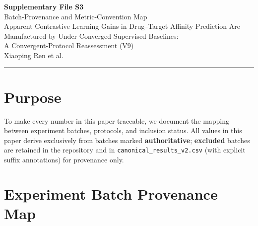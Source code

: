 \documentclass[10pt,a4paper]{article}
\begin{document}
\begin{center}
{\Large\bfseries Supplementary File S3}\\[0.5em]
{\large Batch-Provenance and Metric-Convention Map}\\[1em]
Apparent Contrastive Learning Gains in Drug--Target Affinity Prediction Are Manufactured by Under-Converged Supervised Baselines:\\A Convergent-Protocol Reassessment (V9)\\[0.5em]
Xiaoping Ren et al.
\end{center}

\noindent\rule{\linewidth}{1pt}
\vspace{1em}

\section{Purpose}

To make every number in this paper traceable, we document the mapping between experiment batches, protocols, and inclusion status. All values in this paper derive exclusively from batches marked \textbf{authoritative}; \textbf{excluded} batches are retained in the repository and in \texttt{canonical\_results\_v2.csv} (with explicit suffix annotations) for provenance only.

\section{Experiment Batch Provenance Map}
\end{document}
